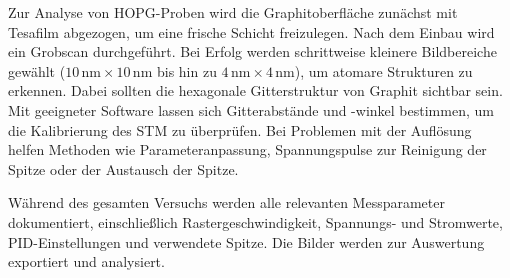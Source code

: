 Zur Analyse von HOPG-Proben wird die Graphitoberfläche zunächst mit Tesafilm abgezogen, um eine frische Schicht freizulegen. Nach dem Einbau wird ein Grobscan durchgeführt. Bei Erfolg werden schrittweise kleinere Bildbereiche gewählt ($10\,\text{nm} \times 10\,\text{nm}$ bis hin zu $4\,\text{nm} \times 4\,\text{nm}$), um atomare Strukturen zu erkennen. Dabei sollten die hexagonale Gitterstruktur von Graphit sichtbar sein. Mit geeigneter Software lassen sich Gitterabstände und -winkel bestimmen, um die Kalibrierung des STM zu überprüfen. Bei Problemen mit der Auflösung helfen Methoden wie Parameteranpassung, Spannungspulse zur Reinigung der Spitze oder der Austausch der Spitze.

Während des gesamten Versuchs werden alle relevanten Messparameter dokumentiert, einschließlich Rastergeschwindigkeit, Spannungs- und Stromwerte, PID-Einstellungen und verwendete Spitze. Die Bilder werden zur Auswertung exportiert und analysiert.
